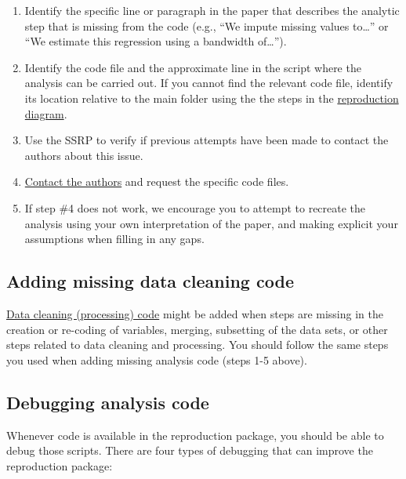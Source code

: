 \documentclass[
]{book}
\providecommand{\tightlist}{%
  \setlength{\itemsep}{0pt}\setlength{\parskip}{0pt}}
\begin{document}
\begin{enumerate}
\def\labelenumi{\arabic{enumi}.}
\tightlist
\item
  Identify the specific line or paragraph in the paper that describes the analytic step that is missing from the code (e.g., ``We impute missing values to\ldots{}'' or ``We estimate this regression using a bandwidth of\ldots{}'').\\
\item
  Identify the code file and the approximate line in the script where the analysis can be carried out. If you cannot find the relevant code file, identify its location relative to the main folder using the the steps in the \protect\hyperlink{diagram}{reproduction diagram}.\\
\item
  Use the SSRP to verify if previous attempts have been made to contact the authors about this issue.\\
\item
  \protect\hyperlink{tips-for-communication}{Contact the authors} and request the specific code files.\\
\item
  If step \#4 does not work, we encourage you to attempt to recreate the analysis using your own interpretation of the paper, and making explicit your assumptions when filling in any gaps.
\end{enumerate}

\hypertarget{cc}{%
\subsection{Adding missing data cleaning code}\label{cc}}

\protect\hyperlink{describe-inputs}{Data cleaning (processing) code} might be added when steps are missing in the creation or re-coding of variables, merging, subsetting of the data sets, or other steps related to data cleaning and processing. You should follow the same steps you used when adding missing analysis code (steps 1-5 above).

\hypertarget{dac}{%
\subsection{Debugging analysis code}\label{dac}}

Whenever code is available in the reproduction package, you should be able to debug those scripts. There are four types of debugging that can improve the reproduction package:
\end{document}
